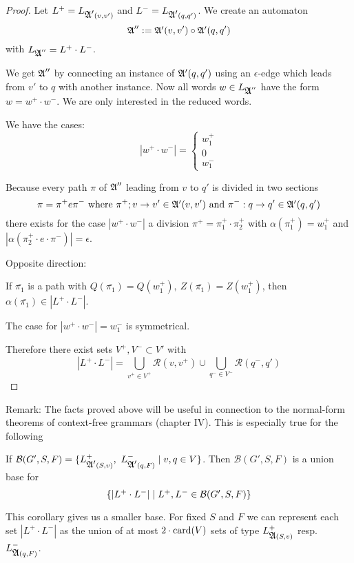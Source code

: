 \begin{proof}
Let $L^+ = L_{\mbox{$\mathfrak{A'}$}(v, v')}$ and $L^- = L_{\mbox{$\mathfrak{A'}$}(q, q')}$. We create an
automaton
\[ \mbox{$\mathfrak{A}$}'' := \mbox{$\mathfrak{A'}$}(v, v') \circ \mbox{$\mathfrak{A'}$}(q, q') \]
with $L_{\mbox{$\mathfrak{A}$}''} = L^+ \cdot L^-$.

We get $\mbox{$\mathfrak{A}$}''$ by connecting an instance of $\mbox{$\mathfrak{A'}$}(q, q')$ using an
$\epsilon$-edge which leads from $v'$ to $q$ with another instance. Now all
words $w \in L_{\mbox{$\mathfrak{A}$}''}$ have the form $w = w^+ \cdot w^-$. We are only
interested in the reduced words.

We have the cases:
\[ |w^+ \cdot w^-| = \begin{cases} w_1^+ \\ 0 \\ w_1^- \end{cases} \]

Because every path $\pi$ of $\mbox{$\mathfrak{A}$}''$ leading from $v$ to $q'$ is divided in
two sections
\[ \pi = \pi^+ e \pi^- \text{ where }\pi^+; v \to v' \in \mbox{$\mathfrak{A'}$}(v, v') \text{
and }\pi^- : q \to q' \in \mbox{$\mathfrak{A'}$}(q, q') \]
there exists for the case $|w^+ \cdot w^-|$ a division $\pi^+ = \pi_1^+ \cdot
\pi_2^+$ with $\alpha(\pi_1^+) = w_1^+$ and $|\alpha(\pi_2^+ \cdot e \cdot
\pi^-)| = \epsilon$.

Opposite direction:

If $\bar{\pi_1}$ is a path with $Q(\bar{\pi_1}) = Q(w_1^+),\ Z(\bar{\pi_1}) =
Z(w_1^+)$, then $\alpha(\bar{\pi_1}) \in |L^+ \cdot L^-|$.

The case for $|w^+ \cdot w^-| = w_1^-$ is symmetrical.

Therefore there exist sets $V^+, V^- \subset V'$ with
\[ |L^+ \cdot L^-| = \bigcup_{v^+ \in V^+} \mathcal{R}(v, v^+) \cup
\bigcup_{q^- \in V^-} \mathcal{R}(q^-, q') \]
\end{proof}

Remark: The facts proved above will be useful in connection to the normal-form
theorems of context-free grammars (chapter IV). This is especially true for the
following

\begin{corollary}
If $\mathcal{B}(G', S, F) = \mbox{$\{L^+_{\mbox{$\mathfrak{A'}$}(S, v)},\ L^-_{\mbox{$\mathfrak{A'}$}(q, F)}
\mid v, q \in V\}$}$. Then $\mathcal{B}(G', S, F)$ is a union base for
\[ \mbox{$\{|L^+ \cdot L^-| \mid L^+, L^- \in \mathcal{B}(G', S, F)\}$} \]
\end{corollary}

This corollary gives us a smaller base. For fixed $S$ and $F$ we can represent
each set $|L^+ \cdot L^-|$ as the union of at most $2 \cdot \mathrm{card}(V)$ sets of
type $L^+_{\mbox{$\mathfrak{A}$}(S, v)}$ resp.\ $L^-_{\mbox{$\mathfrak{A}$}(q, F)}$.


